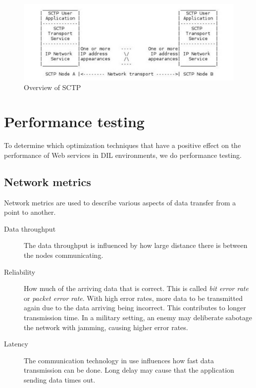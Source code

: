 \begin{figure}[h]
\includegraphics[scale=0.5]{images/sctp.pdf}
\caption{Overview of SCTP}
\end{figure}

\section{Performance testing}

To determine which optimization techniques that have a positive effect on the
performance of Web services in DIL environments, we do performance testing.

\subsection{Network metrics}

Network metrics are used to describe various aspects of data transfer from a
point to another.

\begin{description}

\item[Data throughput] The data throughput is influenced by how large distance
there is between the nodes communicating.

\item[Reliability] How much of the arriving data that is correct. This is
called \textit{bit error rate} or \textit{packet error rate}. With high error
rates, more data to be transmitted again due to the data arriving being
incorrect. This contributes to longer transmission time. In a military setting,
an enemy may deliberate sabotage the network with jamming, causing higher error
rates.

\item[Latency] The communication technology in use influences how fast data
transmission can be done. Long delay may cause that the application sending data
times out.

\end{description}

